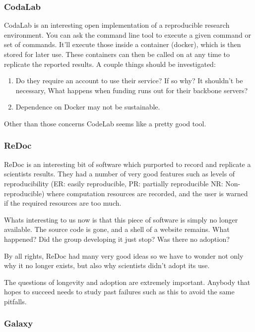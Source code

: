 \documentclass[american]{article}
\begin{document}
\subsubsection{CodaLab}

CodaLab is an interesting open implementation of a reproducible research environment. You can ask the command line tool to execute a given command or set of commands. It'll execute those inside a container (docker), which is then stored for later use. These containers can then be called on at any time to replicate the reported results. A couple things should be investigated:
\begin{enumerate}
\item Do they require an account to use their service? If so why? It shouldn't be necessary, What happens when funding runs out for their backbone servers?
\item Dependence on Docker may not be sustainable.
\end{enumerate}

Other than those concerns CodeLab seems like a pretty good tool.

\subsubsection{ReDoc}

ReDoc is an interesting bit of software which purported to record and replicate a scientists results. They had a number of very good features such as levels of reproducibility (ER: easily reproducible, PR: partially reproducible NR: Non-reproducible) where computation resources are recorded, and the user is warned if the required resources are too much. \cite{claerbout-make-reproducible-2000}

Whats interesting to us now is that this piece of software is simply no longer available. The source code is gone, and a shell of a website remains. What happened? Did the group developing it just stop? Was there no adoption?

By all rights, ReDoc had many very good ideas so we have to wonder not only why it no longer exists, but also why scientists didn't adopt its use.

The questions of longevity and adoption are extremely important. Anybody that hopes to succeed needs to study past failures such as this to avoid the same pitfalls. 

\subsubsection{Galaxy}
\end{document}
